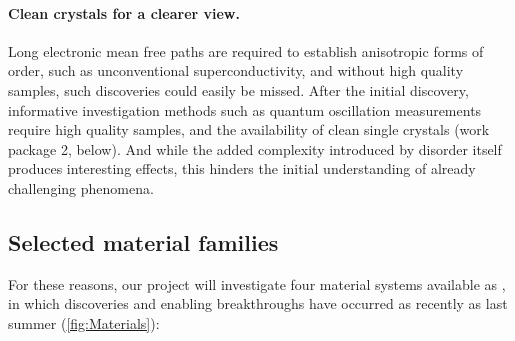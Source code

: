 \paragraph{Clean crystals for a clearer view.} Long electronic mean free paths are required to establish anisotropic forms of order, such as unconventional superconductivity, and without high quality samples, such discoveries could easily be missed. After the initial discovery, informative investigation methods such as quantum oscillation measurements require high quality samples, and the availability of clean single crystals  (work package 2, below). And while the added complexity introduced by disorder itself produces interesting effects, this hinders the initial understanding of already challenging phenomena. %

\subsection*{Selected material families}
\noindent
For these reasons, our project will investigate four material systems available as , in which discoveries and enabling breakthroughs %
have occurred as recently as last summer (\autoref{fig:Materials}):

